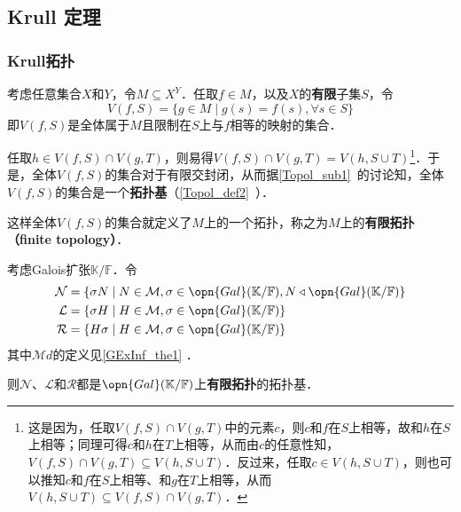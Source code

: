 \subsection{Krull 定理}\label{GExInf_sub1}


\subsubsection{Krull拓扑}

考虑任意集合$X$和$Y$，令$M\subseteq X^Y$．任取$f\in M$，以及$X$的\textbf{有限}子集$S$，令
\begin{equation}
V(f, S) = \{g\in M\mid g(s)=f(s), \forall s\in S\}
\end{equation}
即$V(f, S)$是全体属于$M$且限制在$S$上与$f$相等的映射的集合．

任取$h\in V(f, S)\cap V(g, T)$，则易得$V(f, S)\cap V(g, T) = V(h, S\cup T)$\footnote{这是因为，任取$V(f, S)\cap V(g, T)$中的元素$c$，则$c$和$f$在$S$上相等，故和$h$在$S$上相等；同理可得$c$和$h$在$T$上相等，从而由$c$的任意性知，$V(f, S)\cap V(g, T)\subseteq V(h, S\cup T)$．反过来，任取$c\in V(h, S\cup T)$，则也可以推知$c$和$f$在$S$上相等、和$g$在$T$上相等，从而$V(h, S\cup T)\subseteq V(f, S)\cap V(g, T)$．}．于是，全体$V(f, S)$的集合对于有限交封闭，从而据\autoref{Topol_sub1}~的讨论知，全体$V(f, S)$的集合是一个\textbf{拓扑基}（\autoref{Topol_def2}~）．

这样全体$V(f, S)$的集合就定义了$M$上的一个拓扑，称之为$M$上的\textbf{有限拓扑（finite topology）}．



\begin{theorem}{}
考虑Galois扩张$\mathbb{K}/\mathbb{F}$．令
\begin{equation}
\begin{aligned}
\mathcal{N} &= \{\sigma N\mid N\in\mathcal{M}, \sigma\in\opn{Gal}(\mathbb{K}/\mathbb{F}), N\triangleleft\opn{Gal}(\mathbb{K}/\mathbb{F})\}\\
\mathcal{L} &= \{\sigma H\mid H\in\mathcal{M}, \sigma\in\opn{Gal}(\mathbb{K}/\mathbb{F})\}\\
\mathcal{R} &= \{H\sigma \mid H\in\mathcal{M}, \sigma\in\opn{Gal}(\mathbb{K}/\mathbb{F})\}
\end{aligned}
\end{equation}
其中$\mathcal{M}d$的定义见\autoref{GExInf_the1} ．

则$\mathcal{N}$、$\mathcal{L}$和$\mathcal{R}$都是$\opn{Gal}(\mathbb{K}/\mathbb{F})$上\textbf{有限拓扑}的拓扑基．
\end{theorem}

